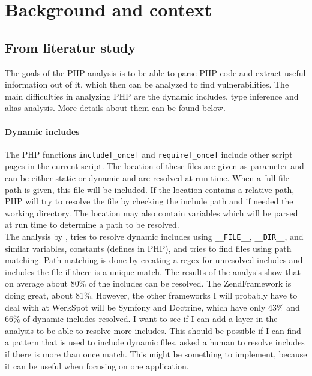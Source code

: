 \documentclass[../main.tex]{subfiles}
\begin{document}
    \section{Background and context}\label{sec:background}
    \subsection{From literatur study}
    \label{phpdynamics}
The goals of the PHP analysis is to be able to parse PHP code and extract useful information out of it, which then can be analyzed to find vulnerabilities.
The main difficulties in analyzing PHP are the dynamic includes, type inference and alias analysis. 
More details about them can be found below.
\paragraph{Dynamic includes}
\label{includes}
The PHP functions \texttt{include[\_once]} and \texttt{require[\_once]} include other script pages in the current script.
The location of these files are given as parameter and can be either static or dynamic and are resolved at run time.
When a full file path is given, this file will be included.
If the location contains a relative path, PHP will try to resolve the file by checking the include path and if needed the working directory.
The location may also contain variables which will be parsed at run time to determine a path to be resolved.
\\
The analysis by  \autocite{Hil:12}, tries to resolve dynamic includes using \texttt{\_\_FILE\_\_}, \texttt{\_\_DIR\_\_}, and similar variables, constants (defines in PHP), and tries to find files using path matching.
Path matching is done by creating a regex for unresolved includes and includes the file if there is a unique match.
The results of the analysis show that on average about 80\% of the includes can be resolved.
The ZendFramework is doing great, about 81\%. However, the other frameworks I will probably have to deal with at WerkSpot will be Symfony and Doctrine, which have only 43\% and 66\% of dynamic includes resolved. 
I want to see if I can add a layer in the analysis to be able to resolve more includes. 
This should be possible if I can find a pattern that is used to include dynamic files.
 \autocite{Son:11} asked a human to resolve includes if there is more than once match.
This might be something to implement, because it can be useful when focusing on one application.
\end{document}
